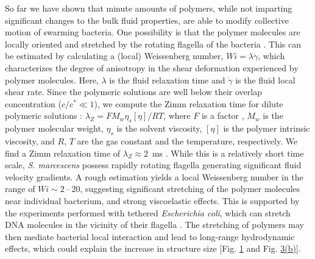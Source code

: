 \documentclass[aps,prl,floatfix,footinbib,twocolumn,superscriptaddress]{revtex4-1}
\begin{document}
So far we have shown that minute amounts of polymers, while not imparting significant changes to the bulk fluid properties, are able to modify collective motion of swarming bacteria. One possibility is that the polymer molecules are locally oriented and stretched by the rotating flagella of the bacteria \cite{Patteson2015}. This can be estimated by calculating a (local) Weissenberg number, $W\!i=\lambda\dot\gamma$, which characterizes the degree of anisotropy in the shear deformation experienced by polymer molecules. Here, $\lambda$ is the fluid relaxation time and $\dot\gamma$ is the fluid local shear rate. Since the polymeric solutions are well below their overlap concentration ($c/c^* \ll 1$), we compute the Zimm relaxation time for dilute polymeric solutions \cite{Zimm_1956}: $\lambda_Z=FM_w\eta_{s}[\eta]/RT$, where $F$ is a factor \cite{Supp_Mat}, $M_w$ is the polymer molecular weight, $\eta_s$ is the solvent viscosity, $[\eta]$ is the polymer intrinsic viscosity, and $R$, $T$ are the gas constant and the temperature, respectively. We find a Zimm relaxation time of $\lambda_Z \approx 2$~ms \cite{Supp_Mat}. While this is a relatively short time scale, \textit{S. marcescens} possess rapidly rotating flagella generating significant fluid velocity gradients. A rough estimation \cite{Supp_Mat} yields a local Weissenberg number in the range of $W\!i\sim 2\,\textrm{--}\,20$, suggesting significant stretching of the polymer molecules near individual bacterium, and strong viscoelastic effects. This is supported by the experiments performed with tethered \textit{Escherichia coli}, which can stretch DNA molecules in the vicinity of their flagella \cite{Patteson2015}. The stretching of polymers may then mediate bacterial local interaction and lead to long-range hydrodynamic effects, which could explain the increase in structure size [Fig. \hyperref[fig1]{1} and Fig. \hyperref[fig3]{3(b)}].
\end{document}
